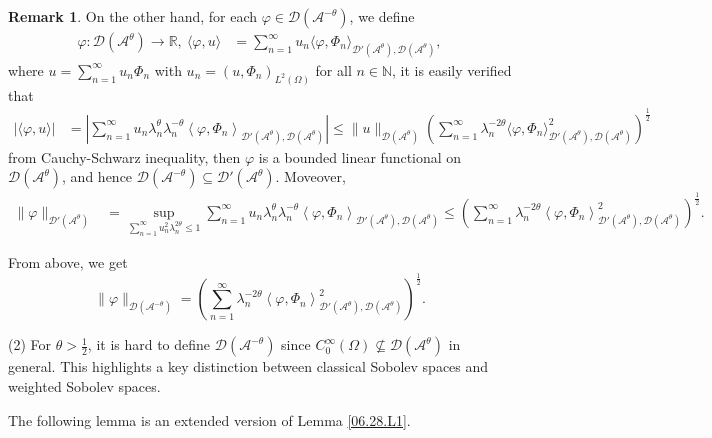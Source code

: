 \documentclass[preprint,12pt]{elsarticle}
\theoremstyle{definition}   %
\newtheorem{remark}[theorem]{Remark}
\numberwithin{equation}{section}
\def\ra{\rightarrow}
\def\s{\subseteq}
\def\vp{\varphi}
\def\lg{\langle}
\def\llg{\left\langle}
\def\rg{\rangle}
\def\rrg{\right\rangle}
\def\Om{\Omega}
\def\la{\lambda}
\def\iy{\infty}
\def\f{\frac}
\def\mcA{\mathcal{A}}
\def\mcD{\mathcal{D}}
\newcommand{\R}{\mathbb R}
\newcommand{\N}{\mathbb N}
\begin{document}
\begin{remark}
	On the other hand, for each $\vp\in \mcD(\mcA^{-\theta})$,  
	we define
	\begin{equation}\label{08.14.1}
		\begin{split}
			\vp: \mcD(\mcA^\theta)\ra \R, \ \lg \vp, u\rg 
			&=\sum_{n=1}^\iy u_n\lg\vp, \Phi_n \rg_{\mcD'(\mcA^{\theta}),\mcD(\mcA^\theta)}, 
		\end{split}
	\end{equation}
	where $u=\sum_{n=1}^\iy u_n\Phi_n$ with $u_n=(u,\Phi_n)_{L^2(\Om)}$ for all $n\in\N$, 
	it is easily verified that  
	\begin{equation*}
		\begin{split}
			\left|\lg \vp, u\rg\right| 
			&= \left|\sum_{n=1}^\iy u_n\la_n^\theta\la_n^{-\theta}\llg \vp, \Phi_n\rrg_{\mcD'(\mcA^{\theta}),\mcD(\mcA^\theta)}\right|\leq \|u\|_{\mcD(\mcA^\theta)}\left(\sum_{n=1}^\iy \la_n^{-2\theta}\lg \vp, \Phi_n\rg_{\mcD'(\mcA^{\theta}),\mcD(\mcA^\theta)}^2\right)^\f{1}{2}
		\end{split}
	\end{equation*}
	from Cauchy-Schwarz inequality, then 
	$\vp$ is a bounded linear functional on $\mcD(\mcA^\theta)$, and hence $\mcD(\mcA^{-\theta})\s\mcD'(\mcA^\theta)$. Moveover,  
	\begin{equation*}
		\begin{split}
			\|\vp\|_{\mcD'(\mcA^{\theta})}
			&=\sup_{
				\sum_{n=1}^\iy u_n^2\la_n^{2\theta}\leq 1}\sum_{n=1}^\iy u_n\la_n^\theta\la_n^{-\theta}\llg \vp, \Phi_n\rrg_{\mcD'(\mcA^{\theta}),\mcD(\mcA^\theta)}\leq \left(\sum_{n=1}^\iy \la_n^{-2\theta}\llg \vp, \Phi_n\rrg_{\mcD'(\mcA^{\theta}),\mcD(\mcA^\theta)}^2\right)^\f{1}{2}.
		\end{split}
	\end{equation*}
	
	
	
	
	From above, we get 
	\begin{equation*}
		\|\vp\|_{\mcD(\mcA^{-\theta})}=\left(\sum_{n=1}^\iy \la_n^{-2\theta}\llg \vp, \Phi_n\rrg_{\mcD'(\mcA^{\theta}),\mcD(\mcA^\theta)}^2\right)^\f{1}{2}.
	\end{equation*} 
	
	(2) For $\theta>\f{1}{2}$, it is hard to define $\mcD(\mcA^{-\theta})$ since $C_0^\iy(\Om)\not\s \mcD(\mcA^\theta)$ in general.  This highlights a key distinction between classical Sobolev spaces and weighted Sobolev spaces.
\end{remark}


The following lemma is an extended version of Lemma \ref{06.28.L1}.
\end{document}
